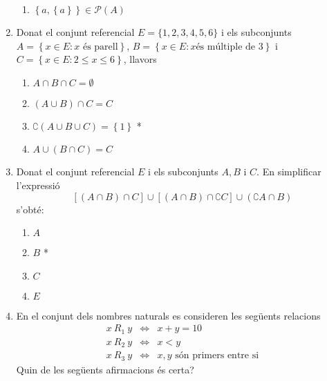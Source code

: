 \begin{enumerate}
\begin{enumerate}
\item $\left\{ a,\left\{ a\right\} \right\} \in\mathcal{P}(A)$
\end{enumerate}

\item Donat el conjunt referencial $E=\{1,2,3,4,5,6\}$ i els subconjunts $%
A=\left\{ x\in E:x\text{ \'{e}s parell}\right\} $, $B=\left\{ x\in E:x\text{
\'{e}s m\'{u}ltiple de 3}\right\} $ i $C=\left\{ x\in E:2\leq x\leq6\right\}
$, llavors

\begin{enumerate}
\item $A\cap B\cap C=\emptyset$

\item $\left( A\cup B\right) \cap C=C$

\item $\complement \left( A\cup B\cup C\right) =\left\{ 1\right\} $ *

\item $A\cup(B\cap C)=C$
\end{enumerate}

\item Donat el conjunt referencial $E$ i els subconjunts $A,B$ i $C$. En
simplificar l'expressi\'{o}%
\begin{equation*}
\left[ (A\cap B)\cap C\right] \cup\left[ (A\cap B)\cap\complement C\right]
\cup\left( \complement A\cap B\right)
\end{equation*}
s'obt\'{e}:

\begin{enumerate}
\item $A$

\item $B$ *

\item $C$

\item $E$
\end{enumerate}

\item En el conjunt dels nombres naturals es consideren les seg\"{u}ents
relacions%
\begin{equation*}
\begin{array}{lll}
x~R_{1}~y & \Longleftrightarrow & x+y=10 \\
x~R_{2}~y & \Longleftrightarrow & x<y \\
x~R_{3}~y & \Longleftrightarrow & x,y\text{ s\'{o}n primers entre si}%
\end{array}%
\end{equation*}
Quin de les seg\"{u}ents afirmacions \'{e}s certa?


\end{enumerate}
